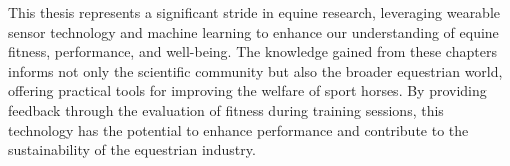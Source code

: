 This thesis represents a significant stride in equine research, leveraging wearable sensor technology and machine learning to enhance our understanding of equine fitness, performance, and well-being. The knowledge gained from these chapters informs not only the scientific community but also the broader equestrian world, offering practical tools for improving the welfare of sport horses. By providing feedback through the evaluation of fitness during training sessions, this technology has the potential to enhance performance and contribute to the sustainability of the equestrian industry.






